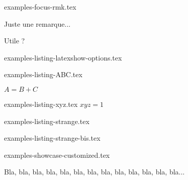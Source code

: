 \begin{filecontents*}[overwrite]{examples-focus-rmk.tex}
\begin{tdocrem}
    Juste une remarque...
\end{tdocrem}

\begin{tdocrem}
    Utile ?
\end{tdocrem}
\end{filecontents*}


\begin{filecontents*}[overwrite]{examples-listing-latexshow-options.tex}
\end{filecontents*}


\begin{filecontents*}[overwrite]{examples-listing-ABC.tex}
\begin{tdoclatex}[sbs]
    $A = B + C$
\end{tdoclatex}
\end{filecontents*}


\begin{filecontents*}[overwrite]{examples-listing-xyz.tex}
$x y z = 1$
\end{filecontents*}


\begin{filecontents*}[overwrite]{examples-listing-strange.tex}
\begin{tdoclatex}
\end{tdoclatex}
\end{filecontents*}


\begin{filecontents*}[overwrite]{examples-listing-strange-bis.tex}
\begin{tdoclatex}
\end{tdoclatex}
\end{filecontents*}


\begin{filecontents*}[overwrite]{examples-showcase-customized.tex}
\begin{tdocshowcase}[before = Mon début,
                     after  = Ma fin à moi,
                     color  = red]
    Bla, bla, bla, bla, bla, bla, bla, bla, bla, bla, bla, bla, bla...
\end{tdocshowcase}
\end{filecontents*}


